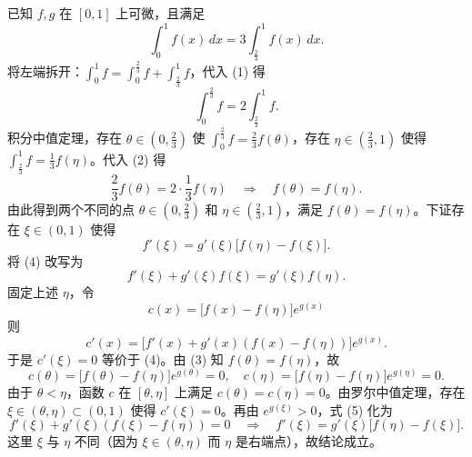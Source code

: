 \begin{solution}
已知 $f,g$ 在 $[0,1]$ 上可微，且满足
\[
\int_0^1 f(x)\,dx = 3\int_{\frac{2}{3}}^1 f(x)\,dx. \tag{1}
\]
将左端拆开：$\displaystyle\int_0^1 f = \int_0^{\frac23} f + \int_{\frac23}^1 f$，代入 (1) 得
\[
\int_0^{\frac23} f = 2\int_{\frac23}^1 f. \tag{2}
\]
积分中值定理，存在 $\theta \in (0,\frac{2}{3})$ 使 $\int_0^{\frac23} f = \frac{2}{3} f(\theta)$，存在 $\eta \in (\frac{2}{3},1)$ 使得 $\int_{\frac23}^1 f = \frac{1}{3} f(\eta)$。代入 (2) 得
\[
\frac{2}{3} f(\theta) = 2\cdot\frac{1}{3} f(\eta) \quad\Longrightarrow\quad f(\theta)=f(\eta). \tag{3}
\]
由此得到两个不同的点 $\theta\in(0,\frac{2}{3})$ 和 $\eta\in(\frac{2}{3},1)$，满足 $f(\theta)=f(\eta)$。下证存在 $\xi\in(0,1)$ 使得
\[
f'(\xi)=g'(\xi)\bigl[f(\eta)-f(\xi)\bigr]. \tag{4}
\]
将 (4) 改写为
\[
f'(\xi)+g'(\xi)f(\xi)=g'(\xi)f(\eta).
\]
固定上述 $\eta$，令
\[
c(x)=\bigl[f(x)-f(\eta)\bigr]e^{g(x)}
\]
则
\[
c'(x)=\bigl[f'(x)+g'(x)(f(x)-f(\eta))\bigr]e^{g(x)}. \tag{5}
\]
于是 $c'(\xi)=0$ 等价于 (4)。由 (3) 知 $f(\theta)=f(\eta)$，故
\[
c(\theta)=\bigl[f(\theta)-f(\eta)\bigr]e^{g(\theta)}=0,\quad c(\eta)=\bigl[f(\eta)-f(\eta)\bigr]e^{g(\eta)}=0.
\]
由于 $\theta<\eta$，函数 $c$ 在 $[\theta,\eta]$ 上满足 $c(\theta)=c(\eta)=0$。由罗尔中值定理，存在 $\xi\in(\theta,\eta)\subset(0,1)$ 使得 $c'(\xi)=0$。再由 $e^{g(\xi)}>0$，式 (5) 化为
\[
f'(\xi)+g'(\xi)(f(\xi)-f(\eta))=0 \quad\Longrightarrow\quad f'(\xi)=g'(\xi)\bigl[f(\eta)-f(\xi)\bigr].
\]
这里 $\xi$ 与 $\eta$ 不同（因为 $\xi\in(\theta,\eta)$ 而 $\eta$ 是右端点），故结论成立。
\end{solution}
